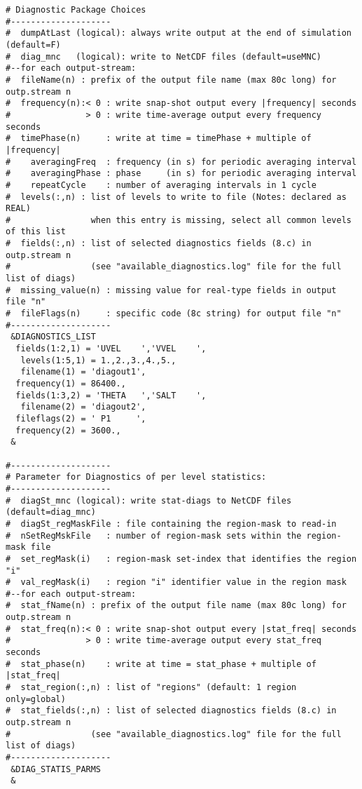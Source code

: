 \begin{verbatim}
# Diagnostic Package Choices
#--------------------
#  dumpAtLast (logical): always write output at the end of simulation (default=F)
#  diag_mnc   (logical): write to NetCDF files (default=useMNC)
#--for each output-stream:
#  fileName(n) : prefix of the output file name (max 80c long) for outp.stream n
#  frequency(n):< 0 : write snap-shot output every |frequency| seconds
#               > 0 : write time-average output every frequency seconds
#  timePhase(n)     : write at time = timePhase + multiple of |frequency|
#    averagingFreq  : frequency (in s) for periodic averaging interval
#    averagingPhase : phase     (in s) for periodic averaging interval
#    repeatCycle    : number of averaging intervals in 1 cycle
#  levels(:,n) : list of levels to write to file (Notes: declared as REAL)
#                when this entry is missing, select all common levels of this list
#  fields(:,n) : list of selected diagnostics fields (8.c) in outp.stream n
#                (see "available_diagnostics.log" file for the full list of diags)
#  missing_value(n) : missing value for real-type fields in output file "n"
#  fileFlags(n)     : specific code (8c string) for output file "n"
#--------------------
 &DIAGNOSTICS_LIST
  fields(1:2,1) = 'UVEL    ','VVEL    ', 
   levels(1:5,1) = 1.,2.,3.,4.,5., 
   filename(1) = 'diagout1', 
  frequency(1) = 86400., 
  fields(1:3,2) = 'THETA   ','SALT    ',
   filename(2) = 'diagout2', 
  fileflags(2) = ' P1     ', 
  frequency(2) = 3600., 
 &

#--------------------
# Parameter for Diagnostics of per level statistics:
#--------------------
#  diagSt_mnc (logical): write stat-diags to NetCDF files (default=diag_mnc)
#  diagSt_regMaskFile : file containing the region-mask to read-in
#  nSetRegMskFile   : number of region-mask sets within the region-mask file
#  set_regMask(i)   : region-mask set-index that identifies the region "i"
#  val_regMask(i)   : region "i" identifier value in the region mask
#--for each output-stream:
#  stat_fName(n) : prefix of the output file name (max 80c long) for outp.stream n
#  stat_freq(n):< 0 : write snap-shot output every |stat_freq| seconds
#               > 0 : write time-average output every stat_freq seconds
#  stat_phase(n)    : write at time = stat_phase + multiple of |stat_freq|
#  stat_region(:,n) : list of "regions" (default: 1 region only=global)
#  stat_fields(:,n) : list of selected diagnostics fields (8.c) in outp.stream n
#                (see "available_diagnostics.log" file for the full list of diags)
#--------------------
 &DIAG_STATIS_PARMS
 &
\end{verbatim}

